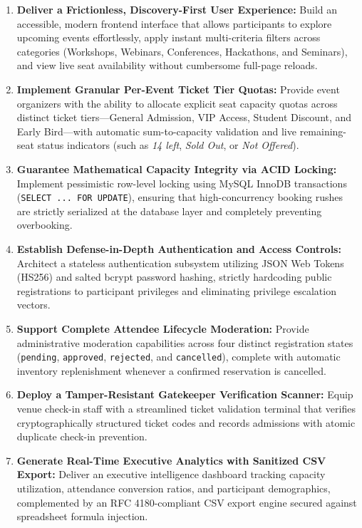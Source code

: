 \documentclass[11pt,a4paper]{report}
\begin{document}
\begin{enumerate}[leftmargin=1.5em, itemsep=0.8em]
    \item \textbf{Deliver a Frictionless, Discovery-First User Experience:} Build an accessible, modern frontend interface that allows participants to explore upcoming events effortlessly, apply instant multi-criteria filters across categories (Workshops, Webinars, Conferences, Hackathons, and Seminars), and view live seat availability without cumbersome full-page reloads.
    \item \textbf{Implement Granular Per-Event Ticket Tier Quotas:} Provide event organizers with the ability to allocate explicit seat capacity quotas across distinct ticket tiers---General Admission, VIP Access, Student Discount, and Early Bird---with automatic sum-to-capacity validation and live remaining-seat status indicators (such as \textit{14 left}, \textit{Sold Out}, or \textit{Not Offered}).
    \item \textbf{Guarantee Mathematical Capacity Integrity via ACID Locking:} Implement pessimistic row-level locking using MySQL InnoDB transactions (\texttt{SELECT ... FOR UPDATE}), ensuring that high-concurrency booking rushes are strictly serialized at the database layer and completely preventing overbooking.
    \item \textbf{Establish Defense-in-Depth Authentication and Access Controls:} Architect a stateless authentication subsystem utilizing JSON Web Tokens (HS256) and salted bcrypt password hashing, strictly hardcoding public registrations to participant privileges and eliminating privilege escalation vectors.
    \item \textbf{Support Complete Attendee Lifecycle Moderation:} Provide administrative moderation capabilities across four distinct registration states (\texttt{pending}, \texttt{approved}, \texttt{rejected}, and \texttt{cancelled}), complete with automatic inventory replenishment whenever a confirmed reservation is cancelled.
    \item \textbf{Deploy a Tamper-Resistant Gatekeeper Verification Scanner:} Equip venue check-in staff with a streamlined ticket validation terminal that verifies cryptographically structured ticket codes and records admissions with atomic duplicate check-in prevention.
    \item \textbf{Generate Real-Time Executive Analytics with Sanitized CSV Export:} Deliver an executive intelligence dashboard tracking capacity utilization, attendance conversion ratios, and participant demographics, complemented by an RFC 4180-compliant CSV export engine secured against spreadsheet formula injection.
\end{enumerate}
\end{document}

